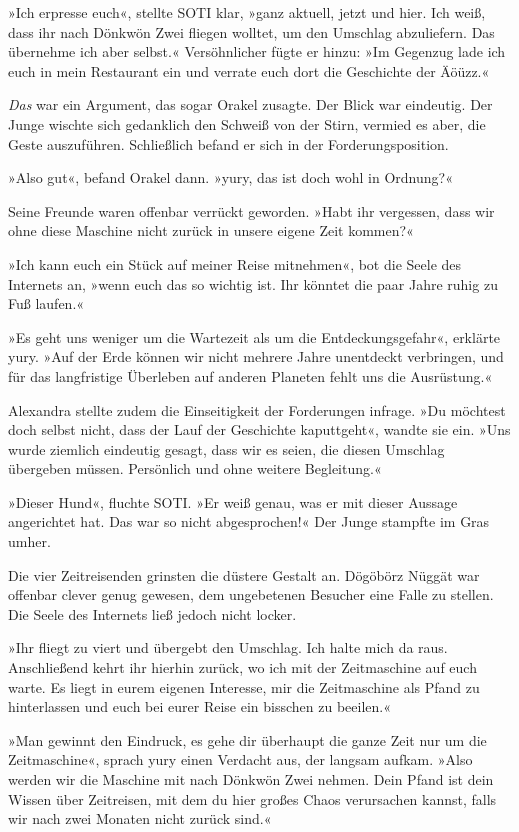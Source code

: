 »Ich erpresse euch«, stellte SOTI klar, »ganz aktuell, jetzt und hier. Ich weiß, dass ihr nach Dönkwön Zwei fliegen wolltet, um den Umschlag abzuliefern. Das übernehme ich aber selbst.« Versöhnlicher fügte er hinzu: »Im Gegenzug lade ich euch in mein Restaurant ein und verrate euch dort die Geschichte der Äöüzz.«

\emph{Das} war ein Argument, das sogar Orakel zusagte. Der Blick war eindeutig. Der Junge wischte sich gedanklich den Schweiß von der Stirn, vermied es aber, die Geste auszuführen. Schließlich befand er sich in der Forderungsposition.

»Also gut«, befand Orakel dann. »yury, das ist doch wohl in Ordnung?«

Seine Freunde waren offenbar verrückt geworden. »Habt ihr vergessen, dass wir ohne diese Maschine nicht zurück in unsere eigene Zeit kommen?«

»Ich kann euch ein Stück auf meiner Reise mitnehmen«, bot die Seele des Internets an, »wenn euch das so wichtig ist. Ihr könntet die paar Jahre ruhig zu Fuß laufen.«

»Es geht uns weniger um die Wartezeit als um die Entdeckungsgefahr«, erklärte yury. »Auf der Erde können wir nicht mehrere Jahre unentdeckt verbringen, und für das langfristige Überleben auf anderen Planeten fehlt uns die Ausrüstung.«

Alexandra stellte zudem die Einseitigkeit der Forderungen infrage. »Du möchtest doch selbst nicht, dass der Lauf der Geschichte kaputtgeht«, wandte sie ein. »Uns wurde ziemlich eindeutig gesagt, dass wir es seien, die diesen Umschlag übergeben müssen. Persönlich und ohne weitere Begleitung.«

»Dieser Hund«, fluchte SOTI. »Er weiß genau, was er mit dieser Aussage angerichtet hat. Das war so nicht abgesprochen!« Der Junge stampfte im Gras umher.

Die vier Zeitreisenden grinsten die düstere Gestalt an. Dögöbörz Nüggät war offenbar clever genug gewesen, dem ungebetenen Besucher eine Falle zu stellen. Die Seele des Internets ließ jedoch nicht locker.

»Ihr fliegt zu viert und übergebt den Umschlag. Ich halte mich da raus. Anschließend kehrt ihr hierhin zurück, wo ich mit der Zeitmaschine auf euch warte. Es liegt in eurem eigenen Interesse, mir die Zeitmaschine als Pfand zu hinterlassen und euch bei eurer Reise ein bisschen zu beeilen.«

»Man gewinnt den Eindruck, es gehe dir überhaupt die ganze Zeit nur um die Zeitmaschine«, sprach yury einen Verdacht aus, der langsam aufkam. »Also werden wir die Maschine mit nach Dönkwön Zwei nehmen. Dein Pfand ist dein Wissen über Zeitreisen, mit dem du hier großes Chaos verursachen kannst, falls wir nach zwei Monaten nicht zurück sind.«


